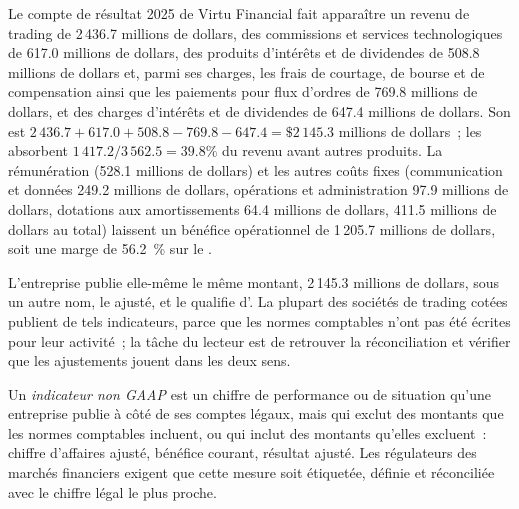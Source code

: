 \label{lst:fm:the-economics-of-a-trading-firm:map}

\begin{example}\label{ex:fm:the-economics-of-a-trading-firm:virtu}
Le compte de résultat 2025 de Virtu Financial fait apparaître un revenu de trading de 2\,436.7 millions de dollars, des commissions et services technologiques de 617.0 millions de dollars,
des produits d'intérêts et de dividendes de 508.8 millions de dollars et, parmi ses charges, les frais de courtage, de bourse et de compensation ainsi que les paiements pour flux d'ordres de
769.8 millions de dollars, et des charges d'intérêts et de dividendes de 647.4 millions de dollars. Son  est $2\,436.7+617.0+508.8-769.8-647.4=\$2\,145.3$
millions de dollars~; les  absorbent $1\,417.2/3\,562.5=39.8\%$ du revenu avant autres produits. La rémunération (528.1 millions de dollars) et les autres
coûts fixes (communication et données 249.2 millions de dollars, opérations et administration 97.9 millions de dollars, dotations aux amortissements 64.4 millions de dollars, 411.5
millions de dollars au total) laissent un bénéfice opérationnel de 1\,205.7 millions de dollars, soit une marge de 56.2~\% sur le .
\end{example}

L'entreprise publie elle-même le même montant, 2\,145.3 millions de dollars, sous un autre nom, le  ajusté, et le qualifie d'. La plupart des sociétés de trading cotées
publient de tels indicateurs, parce que les normes comptables n'ont pas été écrites pour leur activité~; la tâche du lecteur est de retrouver la
réconciliation et vérifier que les ajustements jouent dans les deux sens.

\begin{definition}\label{def:fm:the-economics-of-a-trading-firm:nongaap}
Un \emph{indicateur non GAAP} est un chiffre de performance ou de situation qu'une entreprise publie à côté de ses
comptes légaux, mais qui exclut des montants que les normes comptables incluent, ou qui inclut des montants qu'elles excluent~: chiffre d'affaires ajusté, bénéfice courant, résultat
ajusté. Les régulateurs des marchés financiers exigent que cette mesure soit étiquetée, définie et réconciliée avec le chiffre légal le plus proche.
\end{definition}

